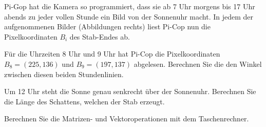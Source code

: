 Pi-Gop hat die Kamera so programmiert, dass sie ab 7 Uhr morgens bis 17 Uhr abends zu jeder vollen
Stunde ein Bild von der Sonnenuhr macht. In jedem der aufgenommenen Bilder (Abbildungen rechts) 
liest Pi-Cop nun die Pixelkoordinaten $B_i$ des Stab-Endes ab. 
\begin{teilaufgaben}
 \item
 Für die Uhrzeiten 8 Uhr und 9 Uhr hat Pi-Cop die Pixelkoordinaten $B_8 = (225, 136 )$ und 
 $B_9 = (197, 137)$ abgelesen.
 Berechnen Sie die den Winkel zwischen diesen beiden Stundenlinien.
 \item
 Um 12 Uhr steht die Sonne genau senkrecht über der Sonnenuhr. Berechnen Sie die Länge des Schattens,
 welchen der Stab erzeugt.
\end{teilaufgaben}

\begin{hinweis}
Berechnen Sie die Matrizen- und Vektoroperationen mit dem Taschenrechner.
\end{hinweis}


